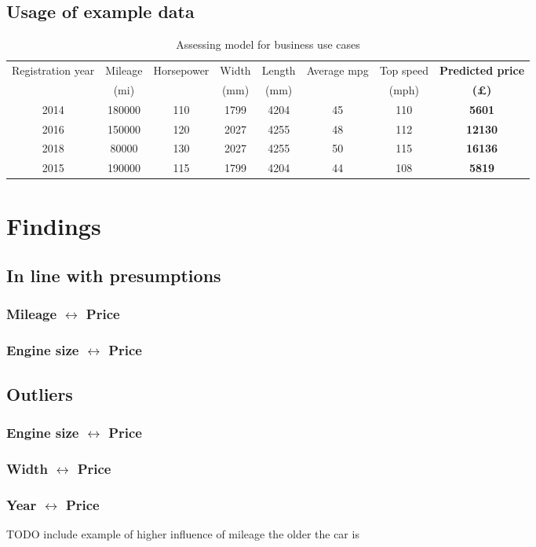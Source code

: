 \subsection{Usage of example data}
\begin{table}[H]
    \begin{adjustbox}{width={\textwidth}}
        \begin{tabular}{|c|c|c|c|c|c|c|c|}
            \hline
            Registration year & Mileage & Horsepower & Width & Length & Average mpg & Top speed & \textbf{Predicted price} \\
                              & (mi)    &            & (mm)  & (mm)   &             & (mph)     & \textbf{(£)}             \\ \hline
            2014              & 180000  & 110        & 1799  & 4204   & 45          & 110       & \textbf{5601}            \\\hline
            2016              & 150000  & 120        & 2027  & 4255   & 48          & 112       & \textbf{12130}           \\\hline
            2018              & 80000   & 130        & 2027  & 4255   & 50          & 115       & \textbf{16136}           \\\hline
            2015              & 190000  & 115        & 1799  & 4204   & 44          & 108       & \textbf{5819}            \\ \hline
        \end{tabular}
    \end{adjustbox}
    \caption{Assessing model for business use cases}
    \label{predicted_price_realworld_data}
\end{table}
\section{Findings}
\subsection{In line with presumptions}
\subsubsection{Mileage $\leftrightarrow$ Price}
\subsubsection{Engine size $\leftrightarrow$ Price}

\subsection{Outliers}
\subsubsection{Engine size $\leftrightarrow$ Price}
\subsubsection{Width $\leftrightarrow$ Price}
\subsubsection{Year $\leftrightarrow$ Price} \label{year_to_price_correlation}
TODO include example of higher influence of mileage the older the car is
